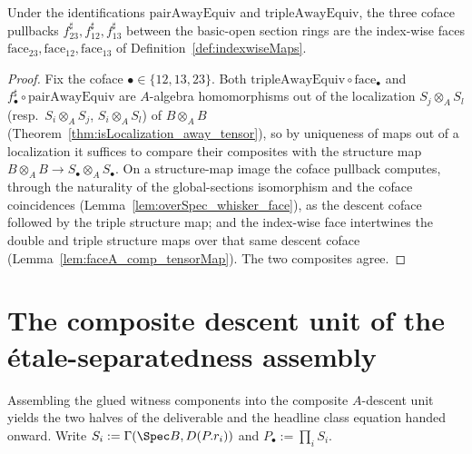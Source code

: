 \begin{lemma}
  \label{lem:tripleAwayEquiv_faceA}
  \leanok
  Under the identifications \(\mathrm{pairAwayEquiv}\) and \(\mathrm{tripleAwayEquiv}\), the
  three coface pullbacks \(f_{23}^{\sharp}, f_{12}^{\sharp}, f_{13}^{\sharp}\) between the
  basic-open section rings are the index-wise faces \(\mathrm{face}_{23}, \mathrm{face}_{12},
  \mathrm{face}_{13}\) of Definition~\ref{def:indexwiseMaps}.
\end{lemma}
\begin{proof}
  \leanok
  Fix the coface \(\bullet \in \{12, 13, 23\}\). Both \(\mathrm{tripleAwayEquiv} \circ
  \mathrm{face}_{\bullet}\) and \(f_{\bullet}^{\sharp} \circ \mathrm{pairAwayEquiv}\) are
  \(A\)-algebra homomorphisms out of the localization \(S_j \otimes_A S_l\) (resp.\ \(S_i
  \otimes_A S_j\), \(S_i \otimes_A S_l\)) of \(B \otimes_A B\)
  (Theorem~\ref{thm:isLocalization_away_tensor}), so by uniqueness of maps out of a localization
  it suffices to compare their composites with the structure map \(B \otimes_A B \to S_\bullet
  \otimes_A S_\bullet\). On a structure-map image the coface pullback computes, through the
  naturality of the global-sections isomorphism and the coface coincidences
  (Lemma~\ref{lem:overSpec_whisker_face}), as the descent coface followed by the triple
  structure map; and the index-wise face intertwines the double and triple structure maps over
  that same descent coface (Lemma~\ref{lem:faceA_comp_tensorMap}). The two composites agree.
\end{proof}

\section{The composite descent unit of the \'etale-separatedness assembly}
\label{sec:witnessAssembly}

Assembling the glued witness components into the composite \(A\)-descent unit yields the two
halves of the deliverable and the headline class equation handed onward. Write \(S_i :=
\Gamma(\Spec B, D(P.r_i))\) and \(P_{\!\bullet} := \prod_i S_i\).

